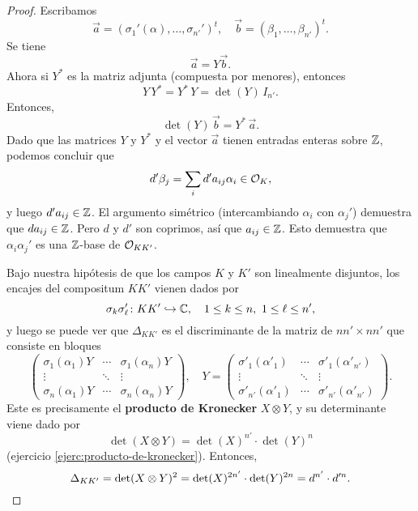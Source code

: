 \begin{proposicion}
\begin{proof}
    Escribamos
    \[ \vec{a} = (\sigma_1' (\alpha), \ldots, \sigma_{n'}')^t, \quad
       \vec{b} = (\beta_1, \ldots, \beta_{n'})^t. \]
    Se tiene
    $$\vec{a} = Y \vec{b}.$$
    Ahora si $Y^*$ es la matriz adjunta (compuesta por menores), entonces
    $$Y\,Y^* = Y^*\,Y = \det (Y)\,I_{n'}.$$
    Entonces,
    $$\det (Y)\,\vec{b} = Y^*\,\vec{a}.$$
    Dado que las matrices $Y$ y $Y^*$ y el vector $\vec{a}$ tienen entradas
    enteras sobre $\mathbb{Z}$, podemos concluir que
    $$d' \beta_j = \sum_i d' a_{ij} \alpha_i \in \mathcal{O}_K,$$
    y luego $d' a_{ij} \in \mathbb{Z}$. El argumento simétrico (intercambiando
    $\alpha_i$ con $\alpha_j'$) demuestra que $d a_{ij} \in \mathbb{Z}$. Pero
    $d$ y $d'$ son coprimos, así que $a_{ij} \in \mathbb{Z}$. Esto
    demuestra que $\alpha_i \alpha_j'$ es una $\mathbb{Z}$-base de $\mathcal{O}_{K K'}$.

    Bajo nuestra hipótesis de que los campos $K$ y $K'$ son linealmente disjuntos,
    los encajes del compositum $K K'$ vienen dados por
    \[ \sigma_k \sigma'_\ell\colon K K' \hookrightarrow \mathbb{C}, \quad
       1 \le k \le n, ~ 1 \le \ell \le n', \]
    y luego se puede ver que $\Delta_{K K'}$ es el discriminante de la matriz
    de $nn'\times nn'$ que consiste en bloques
    \[ \begin{pmatrix}
      \sigma_1 (\alpha_1) Y & \cdots & \sigma_1 (\alpha_n) Y \\
      \vdots & \ddots & \vdots \\
      \sigma_n (\alpha_1) Y & \cdots & \sigma_n (\alpha_n) Y
    \end{pmatrix}, \quad
    Y = \begin{pmatrix}
      \sigma'_1 (\alpha'_1) & \cdots & \sigma'_1 (\alpha'_{n'}) \\
      \vdots & \ddots & \vdots \\
      \sigma'_{n'} (\alpha'_1) & \cdots & \sigma'_{n'} (\alpha'_{n'})
    \end{pmatrix}. \]
    Este es precisamente el \textbf{producto de Kronecker} $X\otimes Y$,
    y su determinante viene dado por
    $$\det (X\otimes Y) = \det (X)^{n'} \cdot \det (Y)^n$$
    (ejercicio \ref{ejerc:producto-de-kronecker}). Entonces,
    \[ \Delta_{K K'} = \det (X \otimes Y)^2
       = \det (X)^{2n'} \cdot \det (Y)^{2n} = d^{n'}\cdot d'^n. \qedhere \]
  \end{proof}
\end{proposicion}

